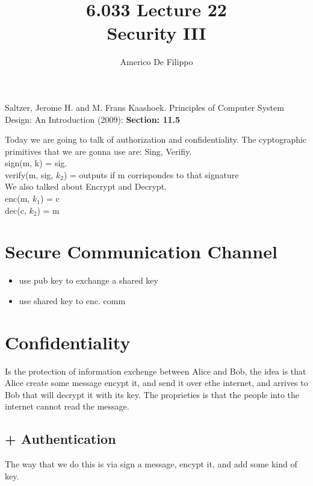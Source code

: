\documentclass{article}
\title{6.033 Lecture 22 \\ Security III}
\author{Americo De Filippo}
\begin{document}
 
  \maketitle
    \begin{thebibliography}{9}
      Saltzer, Jerome H. and M. Frans Kaashoek. Principles of Computer System Design: An Introduction (2009): \textbf{Section: 11.5} 
    \end{thebibliography}
    \maketitle
    Today we are going to talk of authorization and confidentiality. 
    The cyptographic primitives that we are gonna use are: Sing, Verifiy. \\
    sign(m, k) = sig. \\ 
    verify(m, sig, $k_2$) = outputs if m corrispondes to that signature \\
    We also talked about Encrypt and Decrypt. \\
    enc(m, $k_1$) = c \\ 
    dec(c, $k_2$) = m
    \section{Secure Communication Channel}
      \begin{itemize}
        \item use pub key to exchange a shared key 
        \item use shared key to enc. comm
      \end{itemize}
      \section{Confidentiality}
      Is the protection of information exchenge between Alice and Bob, the idea is that 
      Alice create some message encypt it, and send it over ethe internet, and arrives to Bob
      that will decrypt it with its key. The proprieties is that the people into the internet
      cannot read the message.
      \subsection{+ Authentication}
        The way that we do this is via sign a message, encypt it, and add some kind of key.
\end{document}
